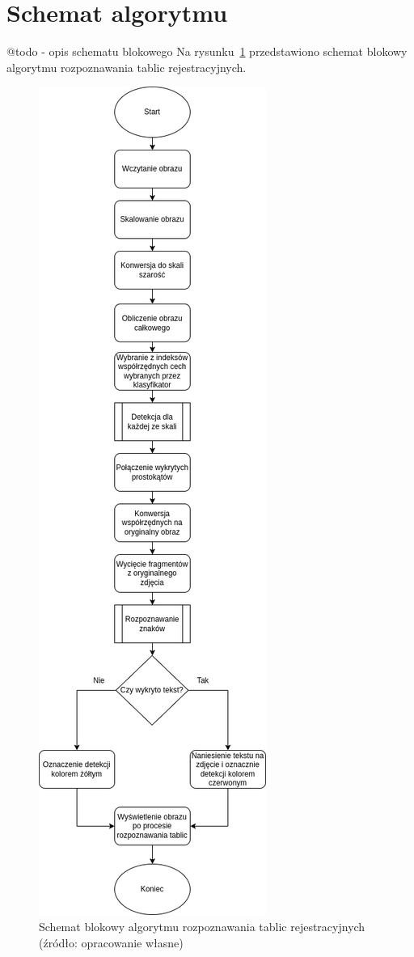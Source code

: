 \section{Schemat algorytmu}
@todo - opis schematu blokowego
Na rysunku~\ref{fig:main_alg} przedstawiono schemat blokowy algorytmu rozpoznawania tablic rejestracyjnych.
\begin{figure}[!ht]
    \centering
    \includegraphics[scale=0.4]{Pictures/main_alg}
    \caption{Schemat blokowy algorytmu rozpoznawania tablic rejestracyjnych (źródło: opracowanie własne)}
    \label{fig:main_alg}
\end{figure}
\FloatBarrier

